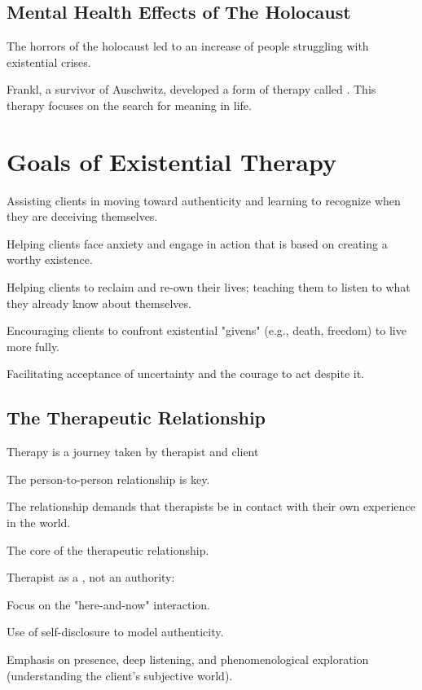 \subsection{Mental Health Effects of The Holocaust}
\begin{coloredlist}
    \item The horrors of the holocaust led to an increase of people struggling with existential crises.
    \item Frankl, a survivor of Auschwitz, developed a form of therapy called . This therapy focuses on the search for meaning in life.
\end{coloredlist}

\section{Goals of Existential Therapy}
\begin{coloredlist}
    \item Assisting clients in moving toward authenticity and learning to recognize when they are deceiving themselves.
    \item Helping clients face anxiety and engage in action that is based on creating a worthy existence.
    \item Helping clients to reclaim and re-own their lives; teaching them to listen to what they already know about themselves.
    \item Encouraging clients to confront existential "givens" (e.g., death, freedom) to live more fully.
    \item Facilitating acceptance of uncertainty and the courage to act despite it.
\end{coloredlist}

\subsection{The Therapeutic Relationship}
\begin{coloredlist}
    \item Therapy is a journey taken by therapist and client
    \begin{coloredlist}
        \item The person-to-person relationship is key.
        \item The relationship demands that therapists be in contact with their own experience in the world.
    \end{coloredlist}
    \item The core of the therapeutic relationship.
    \item Therapist as a , not an authority:
    \begin{coloredlist}
        \item Focus on the "here-and-now" interaction.
        \item Use of self-disclosure to model authenticity.
    \end{coloredlist}
    \item Emphasis on presence, deep listening, and phenomenological exploration (understanding the client’s subjective world).
\end{coloredlist}

